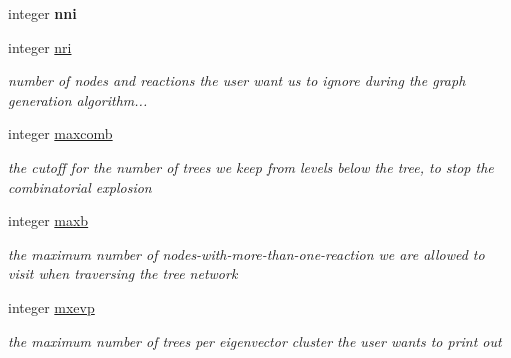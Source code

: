 \begin{DoxyCompactItemize}
\mbox{\label{structglobaldata_1_1graphpar_a6fc3346886b93a7a00dc5f75f314e47b}} 
integer {\bfseries nni}
\item 
\mbox{\label{structglobaldata_1_1graphpar_a6b61499a86bd97ef2d170e30bff5e3a6}} 
integer \mbox{\hyperlink{structglobaldata_1_1graphpar_a6b61499a86bd97ef2d170e30bff5e3a6}{nri}}
\begin{DoxyCompactList}\small\item\em number of nodes and reactions the user want us to ignore during the graph generation algorithm... \end{DoxyCompactList}\item 
\mbox{\label{structglobaldata_1_1graphpar_ab22a73128e7fbf2a4b7927995bcb7e4a}} 
integer \mbox{\hyperlink{structglobaldata_1_1graphpar_ab22a73128e7fbf2a4b7927995bcb7e4a}{maxcomb}}
\begin{DoxyCompactList}\small\item\em the cutoff for the number of trees we keep from levels below the tree, to stop the combinatorial explosion \end{DoxyCompactList}\item 
\mbox{\label{structglobaldata_1_1graphpar_a971fbdf4861ed591939a3c9cd947dca2}} 
integer \mbox{\hyperlink{structglobaldata_1_1graphpar_a971fbdf4861ed591939a3c9cd947dca2}{maxb}}
\begin{DoxyCompactList}\small\item\em the maximum number of nodes-\/with-\/more-\/than-\/one-\/reaction we are allowed to visit when traversing the tree network \end{DoxyCompactList}\item 
\mbox{\label{structglobaldata_1_1graphpar_a192ce45f5d446e095a6b3b19787845e4}} 
integer \mbox{\hyperlink{structglobaldata_1_1graphpar_a192ce45f5d446e095a6b3b19787845e4}{mxevp}}
\begin{DoxyCompactList}\small\item\em the maximum number of trees per eigenvector cluster the user wants to print out \end{DoxyCompactList}\item 
\mbox{\label{structglobaldata_1_1graphpar_ad9b8844b41841dfc53b0c5f541dbd8e6}} 

\end{DoxyCompactItemize}
